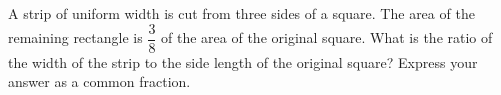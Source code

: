 A strip of uniform width is cut from three sides of a square. The area of the remaining rectangle is $\dfrac{3}{8}$ of the area of the original square. What is the ratio of the width of the strip to the side length of the original square? Express your answer as a common fraction.
